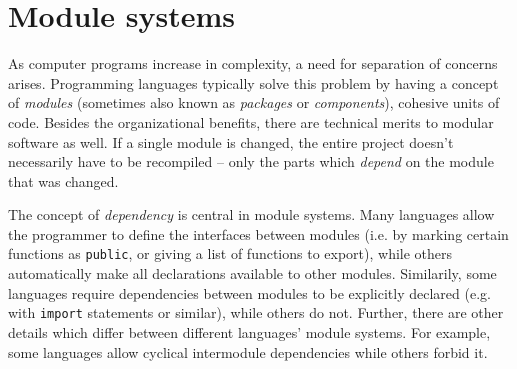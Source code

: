 \section{Module systems}


As computer programs increase in complexity, a need for separation of concerns arises. Programming languages typically solve this problem by having a concept of \emph{modules} (sometimes also known as \emph{packages} or \emph{components}), cohesive units of code. Besides the organizational benefits, there are technical merits to modular software as well. If a single module is changed, the entire project doesn't necessarily have to be recompiled -- only the parts which \emph{depend} on the module that was changed.

The concept of \emph{dependency} is central in module systems. Many languages allow the programmer to define the interfaces between modules (i.e. by marking certain functions as \texttt{public}, or giving a list of functions to export), while others automatically make all declarations available to other modules. Similarily, some languages require dependencies between modules to be explicitly declared (e.g. with \texttt{import} statements or similar), while others do not. Further, there are other details which differ between different languages' module systems. For example, some languages allow cyclical intermodule dependencies while others forbid it. 